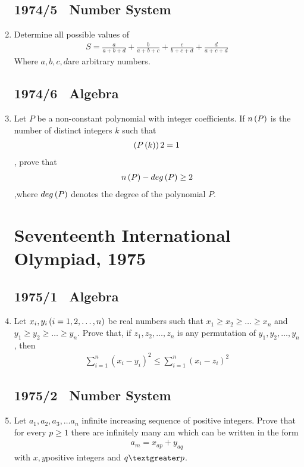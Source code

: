 \documentclass{article}
\begin{document}
\begin{enumerate}
		\subsection*{1974/5 \ Number System}
	\item Determine all possible values of \begin{align} S=\frac{a}{a+b+d}+\frac{b}{a+b+c}+\frac{c}{b+c+d}+\frac{d}{a+c+d} \end{align} 
			Where $a,b,c,d$are arbitrary numbers.
		\subsection*{1974/6 \ Algebra}
		\item Let $P$ be a non-constant polynomial with integer coefficients. If $n\left(P\right)$ is the number of distinct integers $k$ such that 
			\begin{align}\left(P\left(k\right)\right)2 = 1 \end{align}, prove that \begin{align}n\left(P\right)-deg\left(P\right) \geq 2\end{align},where $deg\left(P\right)$ denotes the degree of the polynomial $P$.

\newpage
		\section*{Seventeenth International Olympiad, 1975}
		\subsection*{1975/1 \ Algebra}
	\item Let $x_{i}, y_{i} \left(i=1, 2,\ldots, n\right)$ be real numbers such that $x_{1} \geq x_{2} \geq \ldots \geq x_{n}$ and $y_{1} \geq y_{2} \geq \ldots \geq y_{n}$.
		Prove that, if $z_{1}, z_{2},\ldots, z_{n}$ is any permutation of $y_{1}, y_{2},\ldots , y_{n}$, then
		\begin{align} \sum_{i=1}^{n}(x_{i}-y_{i})^{2}\leq\sum_{i=1}^{n}(x_{i}-z_{i})^{2}
		\end{align}
		\subsection*{1975/2 \ Number System}
	\item Let $a_{1}, a_{2}, a_{3}, \ldots  a_{n}$ infinite increasing sequence of positive integers. Prove that for every $p \geq 1$ there are infinitely many am which can be written in the form
		\begin{align}a_{m} = x_{ap} + y_{aq} \end{align}
			with $x, y$positive integers and $q \textgreater p$.


\end{enumerate}
\end{document}
